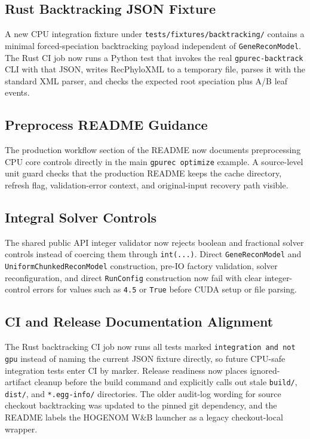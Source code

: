 \documentclass[11pt]{article}
\begin{document}
\subsection{Rust Backtracking JSON Fixture}

A new CPU integration fixture under \texttt{tests/fixtures/backtracking/}
contains a minimal forced-speciation backtracking payload independent of
\texttt{GeneReconModel}.  The Rust CI job now runs a Python test that invokes
the real \texttt{gpurec-backtrack} CLI with that JSON, writes RecPhyloXML to a
temporary file, parses it with the standard XML parser, and checks the expected
root speciation plus A/B leaf events.

\subsection{Preprocess README Guidance}

The production workflow section of the README now documents preprocessing CPU
core controls directly in the main \texttt{gpurec optimize} example.  A
source-level unit guard
checks that the production README keeps the cache directory, refresh flag,
validation-error context, and original-input recovery path visible.

\subsection{Integral Solver Controls}

The shared public API integer validator now rejects boolean and fractional
solver controls instead of coercing them through \texttt{int(...)}.  Direct
\texttt{GeneReconModel} and \texttt{UniformChunkedReconModel} construction,
pre-IO factory validation, solver reconfiguration, and direct
\texttt{RunConfig} construction now fail with clear integer-control errors for
values such as \texttt{4.5} or \texttt{True} before CUDA setup or file parsing.

\subsection{CI and Release Documentation Alignment}

The Rust backtracking CI job now runs all tests marked
\texttt{integration and not gpu} instead of naming the current JSON fixture
directly, so future CPU-safe integration tests enter CI by marker.  Release
readiness now places ignored-artifact cleanup before the build command and
explicitly calls out stale \texttt{build/}, \texttt{dist/}, and
\texttt{*.egg-info/} directories.  The older audit-log wording for source
checkout backtracking was updated to the pinned git dependency, and the README
labels the HOGENOM W\&B launcher as a legacy checkout-local wrapper.
\end{document}
